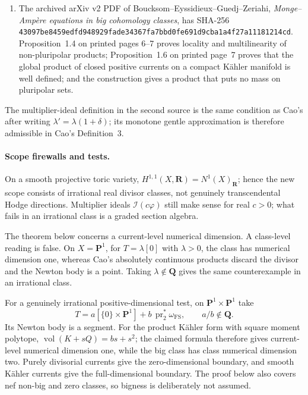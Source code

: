 \begin{enumerate}
\item The archived arXiv v2 PDF of
Boucksom--Eyssidieux--Guedj--Zeriahi,
\emph{Monge--Amp\`ere equations in big cohomology classes}, has SHA-256
\texttt{43097be8459edfd948929fade34367fa7bbd0fe691d9cba1a4f27a11181214cd}.
Proposition~1.4 on printed pages 6--7 proves locality and multilinearity of
non-pluripolar products; Proposition~1.6 on printed page~7 proves that the
global product of closed positive currents on a compact K\"ahler manifold
is well defined; and the construction gives a product that puts no mass on
pluripolar sets.
\end{enumerate}

The multiplier-ideal definition in the second source is the same condition
as Cao's after writing \(\lambda'=\lambda(1+\delta)\); its monotone gentle
approximation is therefore admissible in Cao's Definition~3.

\paragraph{Scope firewalls and tests.}
On a smooth projective toric variety,
\(H^{1,1}(X,\mathbf R)=N^1(X)_{\mathbf R}\); hence the new scope consists of
irrational real divisor classes, not genuinely transcendental Hodge
directions.  Multiplier ideals \(\mathcal I(c\varphi)\) still make sense for
real \(c>0\); what fails in an irrational class is a graded section algebra.

The theorem below concerns a current-level numerical dimension.  A
class-level reading is false.  On \(X=\mathbf P^1\), for
\(T=\lambda[0]\) with \(\lambda>0\), the class has numerical dimension one,
whereas Cao's absolutely continuous products discard the divisor and the
Newton body is a point.  Taking \(\lambda\notin\mathbf Q\) gives the same
counterexample in an irrational class.

For a genuinely irrational positive-dimensional test, on
\(\mathbf P^1\times\mathbf P^1\) take
\[
 T=a[\{0\}\times\mathbf P^1]
     +b\,\operatorname{pr}_2^*\omega_{\mathrm{FS}},
 \qquad a/b\notin\mathbf Q.
\]
Its Newton body is a segment.  For the product K\"ahler form with square
moment polytope, \(\operatorname{vol}(K+sQ)=bs+s^2\); the claimed formula
therefore gives current-level numerical dimension one, while the big class
has class numerical dimension two.  Purely divisorial currents give the
zero-dimensional boundary, and smooth K\"ahler currents give the
full-dimensional boundary.  The proof below also covers nef non-big and zero
classes, so bigness is deliberately not assumed.

